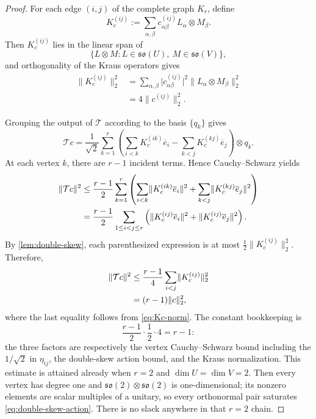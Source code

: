 \documentclass[11pt,reqno]{amsart}
\theoremstyle{remark}
\newcommand{\norm}[1]{\lVert #1\rVert}
\newcommand{\abs}[1]{\lvert #1\rvert}
\begin{document}
\begin{proof}
For each edge $(i,j)$ of the complete graph $K_r$, define
\[
    K_c^{(ij)}
    :=
    \sum_{\alpha,\beta}
    c_{\alpha\beta}^{(ij)}
    L_\alpha\otimes M_\beta.
\]
Then $K_c^{(ij)}$ lies in the linear span of
\[
    \{L\otimes M:
      L\in\mathfrak{so}(U),\ M\in\mathfrak{so}(V)\},
\]
and orthogonality of the Kraus operators gives
\begin{equation}
\label{eq:Kc-norm}
\begin{aligned}
    \norm{K_c^{(ij)}}_2^2
    &=
    \sum_{\alpha,\beta}
    \abs{c_{\alpha\beta}^{(ij)}}^2
    \norm{L_\alpha\otimes M_\beta}_2^2\\
    &=4\norm{c^{(ij)}}_2^2.
\end{aligned}
\end{equation}

Grouping the output of $\mathcal T$ according to the basis
$\{q_k\}$ gives
\begin{equation}
\label{eq:T-by-vertices}
    \mathcal Tc
    =
    \frac1{\sqrt2}
    \sum_{k=1}^r
    \left(
      \sum_{i<k}K_c^{(ik)}\overline e_i
      -
      \sum_{k<j}K_c^{(kj)}\overline e_j
    \right)
    \otimes q_k.
\end{equation}
At each vertex $k$, there are $r-1$ incident terms. Hence
Cauchy--Schwarz yields
\begin{align}
    \norm{\mathcal Tc}^2
    &\le
    \frac{r-1}{2}
    \sum_{k=1}^r
    \left(
      \sum_{i<k}
      \norm{K_c^{(ik)}\overline e_i}^2
      +
      \sum_{k<j}
      \norm{K_c^{(kj)}\overline e_j}^2
    \right)
    \notag\\
    &=
    \frac{r-1}{2}
    \sum_{1\le i<j\le r}
    \left(
      \norm{K_c^{(ij)}\overline e_i}^2
      +
      \norm{K_c^{(ij)}\overline e_j}^2
    \right).
\label{eq:T-Cauchy}
\end{align}
By \cref{lem:double-skew}, each parenthesized expression is at most
$\frac12\norm{K_c^{(ij)}}_2^2$. Therefore,
\begin{align}
    \norm{\mathcal Tc}^2
    &\le
    \frac{r-1}{4}
    \sum_{i<j}
    \norm{K_c^{(ij)}}_2^2
    \notag\\
    &=(r-1)\norm{c}_2^2,
\label{eq:T-operator-bound}
\end{align}
where the last equality follows from \cref{eq:Kc-norm}.  The constant
bookkeeping is
\[
    \frac{r-1}{2}\cdot\frac12\cdot4=r-1:
\]
the three factors are respectively the vertex Cauchy--Schwarz bound
including the $1/\sqrt2$ in $\eta_{ij}$, the double-skew action bound,
and the Kraus normalization.  This estimate is attained already when
$r=2$ and $\dim U=\dim V=2$.  Then every vertex has degree one and
$\mathfrak{so}(2)\otimes\mathfrak{so}(2)$ is one-dimensional; its
nonzero elements are scalar multiples of a unitary, so every
orthonormal pair saturates \cref{eq:double-skew-action}.  There is no
slack anywhere in that $r=2$ chain.


\end{proof}
\end{document}
